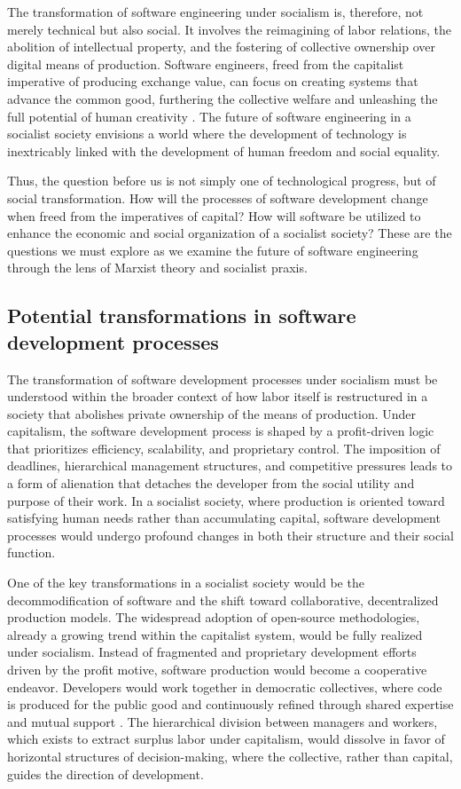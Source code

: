 \begin{refsection}
The transformation of software engineering under socialism is, therefore, not merely technical but also social. It involves the reimagining of labor relations, the abolition of intellectual property, and the fostering of collective ownership over digital means of production. Software engineers, freed from the capitalist imperative of producing exchange value, can focus on creating systems that advance the common good, furthering the collective welfare and unleashing the full potential of human creativity \cite[pp.~243-245]{lenin1917}. The future of software engineering in a socialist society envisions a world where the development of technology is inextricably linked with the development of human freedom and social equality.

Thus, the question before us is not simply one of technological progress, but of social transformation. How will the processes of software development change when freed from the imperatives of capital? How will software be utilized to enhance the economic and social organization of a socialist society? These are the questions we must explore as we examine the future of software engineering through the lens of Marxist theory and socialist praxis.

\subsection{Potential transformations in software development processes}

The transformation of software development processes under socialism must be understood within the broader context of how labor itself is restructured in a society that abolishes private ownership of the means of production. Under capitalism, the software development process is shaped by a profit-driven logic that prioritizes efficiency, scalability, and proprietary control. The imposition of deadlines, hierarchical management structures, and competitive pressures leads to a form of alienation that detaches the developer from the social utility and purpose of their work. In a socialist society, where production is oriented toward satisfying human needs rather than accumulating capital, software development processes would undergo profound changes in both their structure and their social function.

One of the key transformations in a socialist society would be the decommodification of software and the shift toward collaborative, decentralized production models. The widespread adoption of open-source methodologies, already a growing trend within the capitalist system, would be fully realized under socialism. Instead of fragmented and proprietary development efforts driven by the profit motive, software production would become a cooperative endeavor. Developers would work together in democratic collectives, where code is produced for the public good and continuously refined through shared expertise and mutual support \cite[pp.~76-78]{stallman2002}. The hierarchical division between managers and workers, which exists to extract surplus labor under capitalism, would dissolve in favor of horizontal structures of decision-making, where the collective, rather than capital, guides the direction of development.


\end{refsection}

